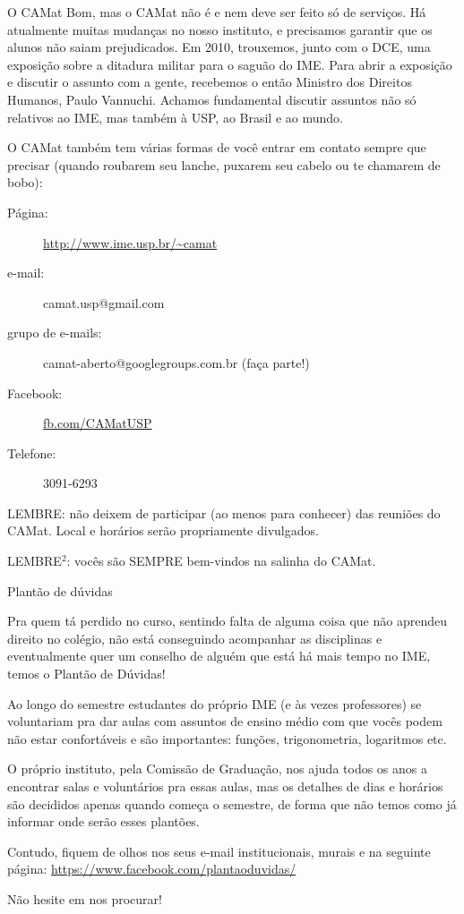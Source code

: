\begin{secao}{O CAMat}
Bom, mas o CAMat não é e nem deve ser feito só de serviços. Há atualmente
muitas mudanças no nosso instituto, e precisamos garantir que os alunos não
saiam prejudicados. Em 2010, trouxemos, junto com o
DCE, uma exposição sobre a ditadura militar para o saguão do IME. Para abrir a
exposição e discutir o assunto com a gente, recebemos o então Ministro dos
Direitos Humanos, Paulo Vannuchi. Achamos fundamental discutir assuntos não só
relativos ao IME, mas também à USP, ao Brasil e ao mundo.

O CAMat também tem várias formas de você entrar em contato sempre que precisar
(quando roubarem seu lanche, puxarem seu cabelo ou te chamarem de bobo):

\begin{description}
\item [Página:] \url{http://www.ime.usp.br/~camat}
\item [e-mail:] camat.usp@gmail.com
\item [grupo de e-mails:] camat-aberto@googlegroups.com.br (faça parte!)
\item [Facebook:] \url{fb.com/CAMatUSP}
\item [Telefone:] 3091-6293
\end{description}

LEMBRE: não deixem de participar (ao menos para conhecer) das reuniões do
CAMat. Local e horários serão propriamente divulgados.

LEMBRE$^2$: vocês são SEMPRE bem-vindos na salinha do CAMat.

\begin{subsecao}{Plantão de dúvidas}

Pra quem tá perdido no curso, sentindo falta de alguma coisa que não aprendeu
direito no colégio, não está conseguindo acompanhar as disciplinas e
eventualmente quer um conselho de alguém que está há mais tempo no IME, temos o
Plantão de Dúvidas!

Ao longo do semestre estudantes do próprio IME (e às vezes professores) se
voluntariam pra dar aulas com assuntos de ensino médio com que vocês podem não
estar confortáveis e são importantes: funções, trigonometria, logaritmos etc.

O próprio instituto, pela Comissão de Graduação, nos ajuda todos os anos a
encontrar salas e voluntários pra essas aulas, mas os detalhes de dias e
horários são decididos apenas quando começa o semestre, de forma que não temos
como já informar onde serão esses plantões.

Contudo, fiquem de olhos nos seus e-mail institucionais, murais e na seguinte
página: \url{https://www.facebook.com/plantaoduvidas/}

Não hesite em nos procurar!

\end{subsecao}

\end{secao}
